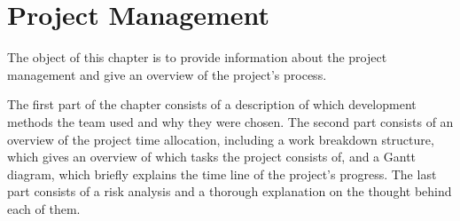 \chapter{Project Management}

The object of this chapter is to provide information about the project management and give an overview of the project's process. 

The first part of the chapter consists of a description of which development methods the team used and why they were chosen. The second part consists of an overview of the project time allocation, including a work breakdown structure, which gives an overview of which tasks the project consists of, and a Gantt diagram, which briefly explains the time line of the project's progress. The last part consists of a risk analysis and a thorough explanation on the thought behind each of them.



\newpage



